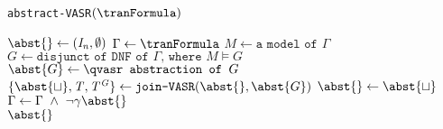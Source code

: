
	\begin{algorithm}[H]
		\caption{\texttt{abstract-VASR$(\tranFormula)$}}\label{euclid}
		\begin{algorithmic}[1]
			\State $\abst{} \gets (\mathit{I_n}, \emptyset)$
			\State $\Gamma \gets \tranFormula$
			\State $M \gets \texttt{a model of } \Gamma$
			\State $G \gets \texttt{disjunct of DNF of } \Gamma \texttt{, where } M \models G$
			\State $\abst{G} \gets \qvasr \texttt{ abstraction of }G$
			\State $\{\abst{\sqcup}, \mathit{T, T^G} \} \gets \texttt{join-VASR}(\abst{}, \abst{G})$
			\State $\abst{} \gets \abst{\sqcup}$
			\State $\Gamma \gets \Gamma\ \land\ \neg\gamma\abst{}$
			\EndWhile \\
			\Return $\abst{}$
		\end{algorithmic}
	\end{algorithm}

